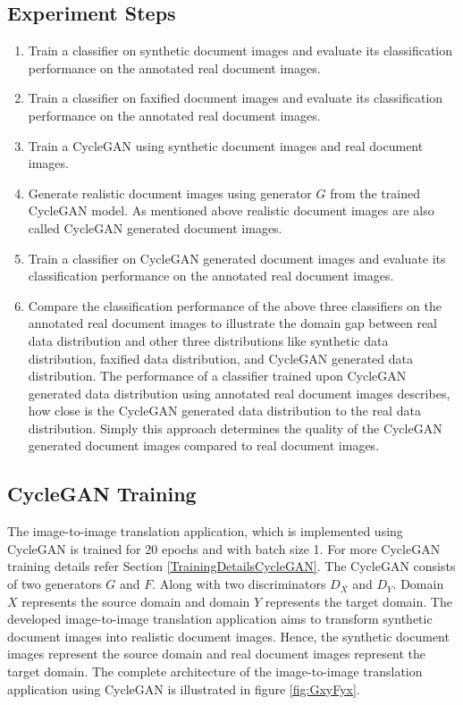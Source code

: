 \subsection{Experiment Steps}


\begin{enumerate}
    \itemsep0em 
    \item Train a classifier on synthetic document images and evaluate its classification performance on the annotated real document images.
    \item Train a classifier on faxified document images and evaluate its classification performance on the annotated real document images.
    \item Train a \ac{CycleGAN} using synthetic document images and real document images.
    \item Generate realistic document images using generator $G$ from the trained \ac{CycleGAN} model. As mentioned above realistic document images are also called \ac{CycleGAN} generated document images.
    \item Train a classifier on \ac{CycleGAN} generated document images and evaluate its classification performance on the annotated real document images.
    \item Compare the classification performance of the above three classifiers on the annotated real document images to illustrate the domain gap between real data distribution and other three distributions like synthetic data distribution, faxified data distribution, and \ac{CycleGAN} generated data distribution. The performance of a classifier trained upon \ac{CycleGAN} generated data distribution using annotated real document images describes, how close is the \ac{CycleGAN} generated data distribution to the real data distribution. Simply this approach determines the quality of the \ac{CycleGAN} generated document images compared to real document images.
\end{enumerate}


\subsection{\ac{CycleGAN} Training}

The image-to-image translation application, which is implemented using \ac{CycleGAN} is trained for 20 epochs and with batch size 1. For more \ac{CycleGAN} training details refer Section \ref{TrainingDetailsCycleGAN}. The \ac{CycleGAN} consists of two generators $G$ and $F$. Along with two discriminators $D_X$ and $D_Y$. Domain $X$ represents the source domain and domain $Y$ represents the target domain. The developed image-to-image translation application aims to transform synthetic document images into realistic document images. Hence, the synthetic document images represent the source domain and real document images represent the target domain. The complete architecture of the image-to-image translation application using \ac{CycleGAN} is illustrated in figure \ref{fig:GxyFyx}.

